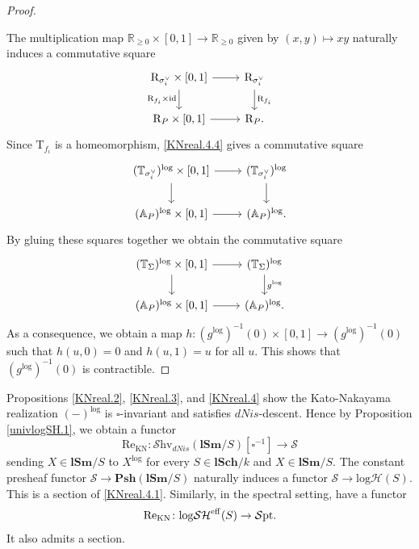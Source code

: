 \documentclass[11pt, a4paper]{amsart}
\theoremstyle{definition}
\numberwithin{equation}{subsection}
\newcommand{\R}{\mathbb{R}}
\newcommand{\A}{\mathbb{A}}
\newcommand{\T}{\mathbb{T}}
\newcommand{\lSch}{\mathbf{lSch}}
\newcommand{\lSm}{\mathbf{lSm}}
\newcommand{\Psh}{\mathbf{Psh}}
\newcommand{\id}{\operatorname{id}}   			%
\newcommand{\Real}{\mathrm{Re}}
\newcommand{\rR}{\mathrm{R}}
\newcommand{\rT}{\mathrm{T}}
\newcommand{\boxx}{\square}
\newcommand{\eff}{{\rm eff}}
\newcommand{\infSpc}{\mathcal{S}}
\newcommand{\infShv}{\mathcal{S}\mathrm{hv}}
\newcommand{\infSpt}{\mathcal{S}\mathrm{pt}}
\newcommand{\inflogH}{\mathrm{log}\mathcal{H}}
\newcommand{\inflogSH}{\mathrm{log}\mathcal{SH}}
\begin{document}
\begin{proof}
\ 

The multiplication map $\R_{\geq 0}\times [0,1]\to \R_{\geq 0}$ given by $(x,y)\mapsto xy$ 
naturally induces a commutative square
\begin{equation}
\label{KNreal.4.4}
\begin{tikzcd}
\rR_{\sigma_i^\vee}\times [0,1]\ar[r]\ar[d,"\rR_{f_i}\times \id"']&
\rR_{\sigma_i^\vee}\ar[d,"\rR_{f_i}"]
\\
\rR_P\times [0,1]\ar[r]&
\rR_P.
\end{tikzcd}
\end{equation}
Since $\rT_{f_i}$ is a homeomorphism, \eqref{KNreal.4.4} gives a commutative square
\[
\begin{tikzcd}
(\T_{\sigma_i^\vee})^{\log}\times [0,1]\ar[d]\ar[r]&
(\T_{\sigma_i^\vee})^{\log}\ar[d]
\\
(\A_P)^{\log}\times [0,1]\ar[r]&
(\A_P)^{\log}.
\end{tikzcd}
\]
By gluing these squares together we obtain the commutative square
\[
\begin{tikzcd}
(\T_\Sigma)^{\log}\times [0,1]\ar[d]\ar[r]&
(\T_\Sigma)^{\log}\ar[d,"g^{\log}"]
\\
(\A_P)^{\log}\times [0,1]\ar[r]&
(\A_P)^{\log}.
\end{tikzcd}
\]
As a consequence, 
we obtain a map $h\colon (g^{\log})^{-1}(0)\times [0,1]\to (g^{\log})^{-1}(0)$ such that $h(u,0)=0$ 
and $h(u,1)=u$ for all $u$.
This shows that $(g^{\log})^{-1}(0)$ is contractible.
\end{proof}

Propositions \ref{KNreal.2}, \ref{KNreal.3}, and \ref{KNreal.4} show  
the Kato-Nakayama realization $(-)^{\log}$ is $\boxx$-invariant and satisfies $dNis$-descent.
Hence by Proposition \ref{univlogSH.1}, we obtain a functor\index[notation]{ReKN @ $\Real_{\mathrm{KN}}$}
\begin{equation}
\label{KNreal.4.1}
\Real_{\mathrm{KN}}
\colon
\infShv_{dNis}(\lSm/S)[\square^{-1}]
\to
\infSpc
\end{equation}
sending $X\in \lSm/S$ to $X^{\log}$ for every $S\in \lSch/k$ and $X\in \lSm/S$.
The constant presheaf functor $\infSpc \to \Psh(\lSm/S)$ naturally induces a functor $\infSpc\to \inflogH(S)$.
This is a section of \eqref{KNreal.4.1}.
Similarly, 
in the spectral setting, 
have a functor
\begin{equation}
\label{KNreal.4.2}
\Real_{\mathrm{KN}}
\colon
\inflogSH^\eff(S)
\to
\infSpt.
\end{equation}
It also admits a section.
\end{document}
